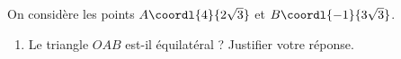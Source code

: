 \begin{exo}{}
	On considère les points $A\coordl{4}{2\sqrt{3}}$ et $B\coordl{-1}{3\sqrt{3}}$.

	\begin{enumerate}
		\item Le triangle $OAB$ est-il équilatéral ? Justifier votre réponse.
	\end{enumerate}
\end{exo}
